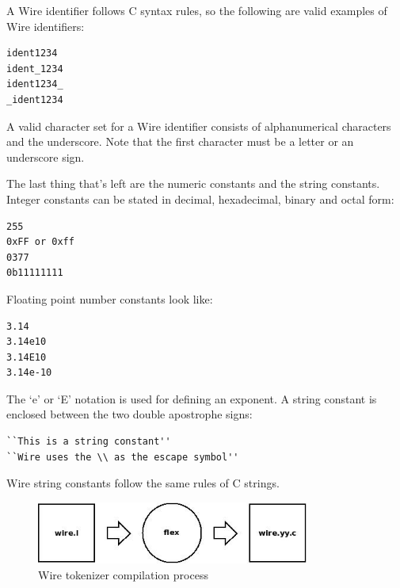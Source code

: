\documentclass[times, utf8, diplomski]{fer}
\begin{document}
A Wire identifier follows C syntax rules, so the following are valid examples of 
Wire identifiers:
\lstset{language=IDL}
\lstset{basicstyle=\footnotesize}
\lstset{numbers=left, numberstyle=\tiny, stepnumber=1, numbersep=5pt}
\begin{lstlisting}[frame=tb]
ident1234
ident_1234
ident1234_
_ident1234
\end{lstlisting}

A valid character set for a Wire identifier consists of alphanumerical characters
and the underscore. Note that the first character must be a letter or an 
underscore sign.

The last thing that's left are the numeric constants and the string constants. 
Integer constants can be stated in decimal, hexadecimal, binary and octal form:
\lstset{language=IDL}
\lstset{basicstyle=\footnotesize}
\lstset{numbers=left, numberstyle=\tiny, stepnumber=1, numbersep=5pt}
\begin{lstlisting}[frame=tb]
255
0xFF or 0xff
0377
0b11111111
\end{lstlisting}

Floating point number constants look like:
\lstset{language=IDL}
\lstset{basicstyle=\footnotesize}
\lstset{numbers=left, numberstyle=\tiny, stepnumber=1, numbersep=5pt}
\begin{lstlisting}[frame=tb]
3.14
3.14e10
3.14E10
3.14e-10
\end{lstlisting}

The `e' or `E' notation is used for defining an exponent.
A string constant is enclosed between the two double apostrophe signs:
\lstset{language=IDL}
\lstset{basicstyle=\footnotesize}
\lstset{numbers=left, numberstyle=\tiny, stepnumber=1, numbersep=5pt}
\begin{lstlisting}[frame=tb]
``This is a string constant''
``Wire uses the \\ as the escape symbol''
\end{lstlisting}
Wire string constants follow the same rules of C strings.

\begin{figure}[htb]
\begin{center}
\leavevmode
\includegraphics[width=0.8\textwidth]{flex}
\end{center}
\caption{Wire tokenizer compilation process}
\label{fig:wire_tknzr_flex}
\end{figure}
\end{document}
